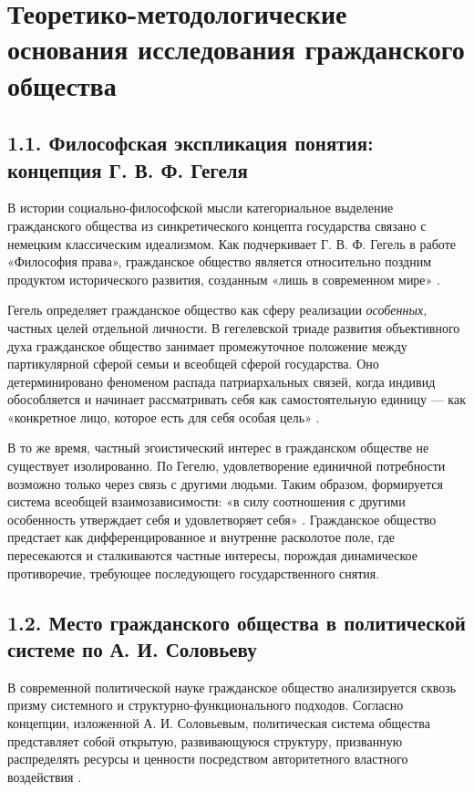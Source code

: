 \documentclass[a4paper, 14pt]{extarticle}
\begin{document}
\newpage

\section{Теоретико-методологические основания исследования гражданского общества}

\subsection{1.1. Философская экспликация понятия: концепция Г. В. Ф. Гегеля}
В истории социально-философской мысли категориальное выделение гражданского общества из синкретического концепта государства связано с немецким классическим идеализмом. Как подчеркивает Г. В. Ф. Гегель в работе «Философия права», гражданское общество является относительно поздним продуктом исторического развития, созданным «лишь в современном мире» \cite{Hegel}. 

Гегель определяет гражданское общество как сферу реализации \textit{особенных}, частных целей отдельной личности. В гегелевской триаде развития объективного духа гражданское общество занимает промежуточное положение между партикулярной сферой семьи и всеобщей сферой государства. Оно детерминировано феноменом распада патриархальных связей, когда индивид обособляется и начинает рассматривать себя как самостоятельную единицу --- как «конкретное лицо, которое есть для себя особая цель» \cite{Hegel}.

В то же время, частный эгоистический интерес в гражданском обществе не существует изолированно. По Гегелю, удовлетворение единичной потребности возможно только через связь с другими людьми. Таким образом, формируется система всеобщей взаимозависимости: «в силу соотношения с другими особенность утверждает себя и удовлетворяет себя» \cite{Hegel}. Гражданское общество предстает как дифференцированное и внутренне расколотое поле, где пересекаются и сталкиваются частные интересы, порождая динамическое противоречие, требующее последующего государственного снятия.

\subsection{1.2. Место гражданского общества в политической системе по А. И. Соловьеву}
В современной политической науке гражданское общество анализируется сквозь призму системного и структурно-функционального подходов. Согласно концепции, изложенной А. И. Соловьевым, политическая система общества представляет собой открытую, развивающуюся структуру, призванную распределять ресурсы и ценности посредством авторитетного властного воздействия \cite{Solovyev}.
\end{document}
